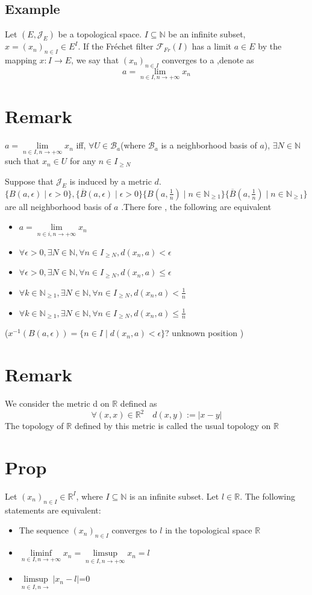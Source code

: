 \documentclass{book}
\begin{document}
\subsection{Example}
Let $(E,\mathcal{J}_E)$ be a topological space. $I\subseteq\mathbb{N} $ be an infinite subset, $x=(x_n)_{n\in I}\in E^I$. If the Fréchet filter $\mathcal{F}_{Fr}(I)$ has a limit $a\in E$ by the mapping $x:I\rightarrow E$, we say that $(x_n)_{n\in I}$ converges to a ,denote as $$a=\lim\limits_{n\in I, n\rightarrow +\infty}x_n$$
\section{Remark}
$a=\lim\limits_{n\in I, n\rightarrow +\infty}x_n$ iff, $\forall U\in \mathscr{B}_a$(where $\mathscr{B}_a$ is a neighborhood basis of $a$), $\exists N\in \mathbb{N} $ such that $x_n\in U$ for any $n\in I_{\geq N}$

Suppose that $\mathcal{J}_E$ is induced by a metric $d$.$\{B(a,\epsilon)\mid\epsilon>0\},\{\overline{B}(a,\epsilon)\mid\epsilon>0\}\{B(a,\frac{1}{n})\mid n\in \mathbb{N} _{\geq 1}\}\{\overline{B}(a,\frac{1}{n})\mid n\in \mathbb{N} _{\geq 1}\}$
are all neighborhood basis of $a$ .There fore , the following are equivalent
\begin{itemize}
    \item $a=\lim\limits_{n\in i,n\rightarrow+\infty}x_n$
    \item $\forall \epsilon>0, \exists N\in \mathbb{N} ,\forall n\in I_{\geq N},d(x_n,a)<\epsilon$
    \item $\forall \epsilon>0, \exists N\in \mathbb{N} ,\forall n\in I_{\geq N},d(x_n,a)\leq\epsilon$
    \item $\forall k\in \mathbb{N} _{\geq 1},\exists N\in \mathbb{N} ,\forall n\in I_{\geq N},d(x_n,a)<\frac{1}{n}$
    \item $\forall k\in \mathbb{N} _{\geq 1},\exists N\in \mathbb{N} ,\forall n\in I_{\geq N},d(x_n,a)\leq\frac{1}{n}$
\end{itemize}
($x^{-1}(B(a,\epsilon))=\{n\in I\mid d(x_n,a)<\epsilon\}$? unknown position )
\section{Remark}
We consider the metric d on $\mathbb{R} $ defined as $$\forall (x,x)\in \mathbb{R} ^2\quad d(x,y):=\lvert x-y\rvert$$
The topology of $\mathbb{R} $ defined by this metric is called the usual topology on $\mathbb{R} $
\section{Prop}Let $(x_n)_{n\in I}\in \mathbb{R} ^I$, where $I\subseteq \mathbb{N} $ is an infinite subset. Let $l\in \mathbb{R} $. The following statements are equivalent:\begin{itemize}
    \item The sequence $(x_n)_{n\in I}$ converges to $l$ in the topological space $\mathbb{R} $
    \item $\liminf\limits_{n\in I,n\rightarrow+\infty}x_n=\limsup\limits_{n\in I,n\rightarrow+\infty}x_n=l$
    \item $\limsup\limits_{n\in I,n\rightarrow}\lvert x_n-l\rvert$=0
\end{itemize}
\end{document}
